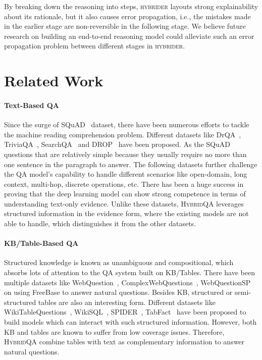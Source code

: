 \documentclass[11pt,a4paper]{article}
\newcommand{\dataset}{\textsc{HybridQA}\xspace}
\newcommand{\model}{\textsc{hybrider}\xspace}
\begin{document}
By breaking down the reasoning into steps, \model layouts strong explainability about its rationale, but it also causes error propagation, i.e., the mistakes made in the earlier stage are non-reversible in the following stage. We believe future research on building an end-to-end reasoning model could alleviate such an error propagation problem between different stages in \model.   

\section{Related Work}
\paragraph{Text-Based QA} Since the surge of SQuAD~\cite{rajpurkar2016squad} dataset, there have been numerous efforts to tackle the machine reading comprehension problem. Different datasets like DrQA~\cite{chen2017reading}, TriviaQA~\cite{joshi2017triviaqa}, SearchQA~\cite{dunn2017searchqa} and DROP~\cite{dua2019drop} have been proposed. As the SQuAD~\cite{rajpurkar2016squad} questions that are relatively simple because they usually require no more than one sentence in the paragraph to answer. The following datasets further challenge the QA model's capability to handle different scenarios like open-domain, long context, multi-hop, discrete operations, etc. There has been a huge success in proving that the deep learning model can show strong competence in terms of understanding text-only evidence. Unlike these datasets, \dataset leverages structured information in the evidence form, where the existing models are not able to handle, which distinguishes it from the other datasets.

\paragraph{KB/Table-Based QA} Structured knowledge is known as unambiguous and compositional, which absorbs lots of attention to the QA system built on KB/Tables. There have been multiple datasets like WebQuestion~\cite{berant2013semantic}, ComplexWebQuestions~\cite{talmor2018web}, WebQuestionSP~\cite{yih2015semantic} on using FreeBase to answer natural questions. Besides KB, structured or semi-structured tables are also an interesting form. Different datasets like WikiTableQuestions~\cite{pasupat2015compositional}, WikiSQL~\cite{zhong2017seq2sql}, SPIDER~\cite{yu2018spider}, TabFact~\cite{2019TabFactA} have been proposed to build models which can interact with such structured information. However, both KB and tables are known to suffer from low coverage issues. Therefore, \dataset combine tables with text as complementary information to answer natural questions.  
\end{document}
